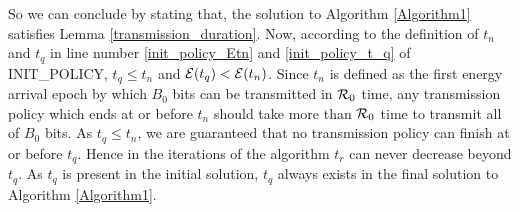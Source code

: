 So we can conclude by stating that, the solution to Algorithm \ref{Algorithm1} satisfies Lemma \ref{transmission_duration}. Now, according to the definition of $t_n$ and $t_q$ in line number \ref{init_policy_Etn} and \ref{init_policy_t_q} of INIT\_POLICY, $t_q\le t_n$ and $\mathcal{E}(t_q)<\mathcal{E}(t_n)$. Since $t_n$ is defined as the first energy arrival epoch by which $B_0$ bits can be transmitted in $\mathcal{R}_0$ time, any transmission policy which ends at or before $t_n$ should take more than $\mathcal{R}_0$ time to transmit all of $B_0$ bits. As $t_q\le t_n$, we are guaranteed that no transmission policy can finish at or before $t_q$. Hence in the iterations of the algorithm $t_r$ can never decrease beyond $t_q$. As $t_q$ is present in the initial solution, $t_q$ always exists in the final solution to Algorithm \ref{Algorithm1}.   
